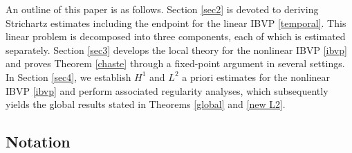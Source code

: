 \documentclass[preprint,compress,12pt]{elsarticle}
\numberwithin{equation}{section}
\begin{document}
An outline of this paper is as follows.    Section \ref{sec2} is devoted to deriving Strichartz estimates including the endpoint for the linear IBVP \eqref{temporal}.  This linear problem is decomposed into three components, each of which is estimated  separately. Section \ref{sec3} develops the local  theory for the nonlinear IBVP \eqref{ibvp} and proves Theorem \ref{chaste} through a fixed-point argument in several settings. In Section \ref{sec4}, we establish $H^1$
and $L^{2}$ a priori estimates for the nonlinear IBVP \eqref{ibvp} and perform associated regularity analyses, which subsequently yields the global  results stated in Theorems \ref{global} and \ref{new L2}.


\subsection{Notation}
\end{document}
